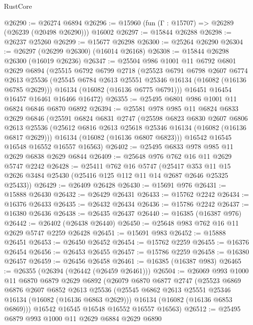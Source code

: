 \begin{lexlean}{RustCore}
\begin{coremodule}
@26290 := @26274 @6894
@26296 := @15960 (fun (Γ : @15707) => @26289 (@26239 (@20498 @26290))) @16002
@26297 := @15844 @26288
@26298 := @26237 @25260
@26299 := @15677 @26298
@26300 := @25264 @26290
@26304 := @26297 (@26299 @26300) (@16014 @26168)
@26308 := @15844 @26298 @26300 (@16019 @26236)
@26347 := @25504
    @986
    @1001
    @11
    @6792
    @6801
    @2629
    @6894
    (@25515
      @6792
      @6799
      @2718
      (@25523
        @6791
        @6798
        @2607
        @6774
        @2613
        @25536
        (@25545 @6784 @2613 @25551 @25346 @16134 (@16082 (@16136 @6785 @2629)))
        @16134
        (@16082 (@16136 @6775 @6791)))
      @16451
      @16454
      @16457
      @16461
      @16466
      @16472)
@26355 := @25495 @6801 @986 @1001 @11 @6824 @6846 @6870 @6892
@26394 := @25581
    @978
    @985
    @11
    @6824
    @6833
    @2629
    @6846
    (@25591
      @6824
      @6831
      @2747
      (@25598
        @6823
        @6830
        @2607
        @6806
        @2613
        @25536
        (@25612 @6816 @2613 @25618 @25346 @16134 (@16082 (@16136 @6817 @2629)))
        @16134
        (@16082 (@16136 @6807 @6823)))
      @16542
      @16545
      @16548
      @16552
      @16557
      @16563)
@26402 := @25495 @6833 @978 @985 @11 @2629 @6838 @2629 @6844
@26409 := @25648 @976 @762 @16 @11 @2629 @5747 @2242
@26428 := @25411
    @762
    @16
    @5747
    (@25417 @353 @11 @15 @2626 @3484 @25430 (@25416 @125 @112 @11 @14 @2687 @2646 @25325 @25433))
@26429 := @26409 @26428
@26430 := @15691 @976
@26431 := @15888 @26430
@26432 := @26429 @26431
@26433 := @15762 @2242
@26434 := @16376 @26433
@26435 := @26432 @26434
@26436 := @15786 @2242
@26437 := @16380 @26436
@26438 := @26435 @26437
@26440 := @16385 (@16387 @976)
@26442 := @26402 (@26438 @26440)
@26450 := @25648 @983 @762 @16 @11 @2629 @5747 @2259 @26428
@26451 := @15691 @983
@26452 := @15888 @26451
@26453 := @26450 @26452
@26454 := @15762 @2259
@26455 := @16376 @26454
@26456 := @26453 @26455
@26457 := @15786 @2259
@26458 := @16380 @26457
@26459 := @26456 @26458
@26461 := @16385 (@16387 @983)
@26465 := @26355 (@26394 (@26442 (@26459 @26461)))
@26504 := @26069
    @993
    @1000
    @11
    @6870
    @6879
    @2629
    @6892
    (@26079
      @6870
      @6877
      @2747
      (@25523
        @6869
        @6876
        @2607
        @6852
        @2613
        @25536
        (@25545 @6862 @2613 @25551 @25346 @16134 (@16082 (@16136 @6863 @2629)))
        @16134
        (@16082 (@16136 @6853 @6869)))
      @16542
      @16545
      @16548
      @16552
      @16557
      @16563)
@26512 := @25495 @6879 @993 @1000 @11 @2629 @6884 @2629 @6890

\end{coremodule}
\end{lexlean}
